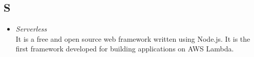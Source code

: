 \subsection*{S}
\begin{itemize}
    \item \textit{Serverless} \\ It is a free and open source web framework written using Node.js. It is the first framework developed for building applications on AWS Lambda.
\end{itemize}